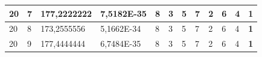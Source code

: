 \documentclass[conference]{IEEEtran}
\begin{document}
\begin{table}[]
\begin{tabular}{|llll|llllllll|}
\multicolumn{1}{|l|}{20}                                                             & \multicolumn{1}{l|}{7}                                                                 & \multicolumn{1}{l|}{177,2222222}                                                           & 7,5182E-35                              & \multicolumn{1}{l|}{8}                                                           & \multicolumn{1}{l|}{3}                                                           & \multicolumn{1}{l|}{5}                                                           & \multicolumn{1}{l|}{7}                                                           & \multicolumn{1}{l|}{2}                                                           & \multicolumn{1}{l|}{6}                                                           & \multicolumn{1}{l|}{4}                                                           & \textbf{1}                          \\ \hline
\multicolumn{1}{|l|}{20}                                                             & \multicolumn{1}{l|}{8}                                                                 & \multicolumn{1}{l|}{173,2555556}                                                           & 5,1662E-34                              & \multicolumn{1}{l|}{8}                                                           & \multicolumn{1}{l|}{3}                                                           & \multicolumn{1}{l|}{5}                                                           & \multicolumn{1}{l|}{7}                                                           & \multicolumn{1}{l|}{2}                                                           & \multicolumn{1}{l|}{6}                                                           & \multicolumn{1}{l|}{4}                                                           & \textbf{1}                          \\ \hline
\multicolumn{1}{|l|}{20}                                                             & \multicolumn{1}{l|}{9}                                                                 & \multicolumn{1}{l|}{177,4444444}                                                           & 6,7484E-35                              & \multicolumn{1}{l|}{8}                                                           & \multicolumn{1}{l|}{3}                                                           & \multicolumn{1}{l|}{5}                                                           & \multicolumn{1}{l|}{7}                                                           & \multicolumn{1}{l|}{2}                                                           & \multicolumn{1}{l|}{6}                                                           & \multicolumn{1}{l|}{4}                                                           & \textbf{1}                          \\ \hline
\end{tabular}
\label{tab:tabla1.1}
\end{table}
\end{document}
